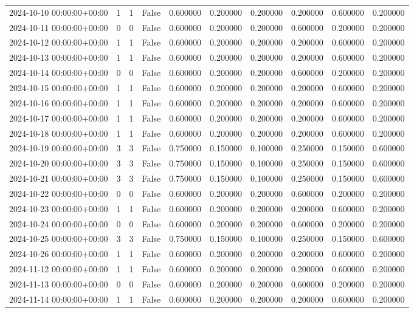 \begin{tabular}{lrrrrrrrrr}
2024-10-10 00:00:00+00:00 & 1 & 1 & False & 0.600000 & 0.200000 & 0.200000 & 0.200000 & 0.600000 & 0.200000 \\
2024-10-11 00:00:00+00:00 & 0 & 0 & False & 0.600000 & 0.200000 & 0.200000 & 0.600000 & 0.200000 & 0.200000 \\
2024-10-12 00:00:00+00:00 & 1 & 1 & False & 0.600000 & 0.200000 & 0.200000 & 0.200000 & 0.600000 & 0.200000 \\
2024-10-13 00:00:00+00:00 & 1 & 1 & False & 0.600000 & 0.200000 & 0.200000 & 0.200000 & 0.600000 & 0.200000 \\
2024-10-14 00:00:00+00:00 & 0 & 0 & False & 0.600000 & 0.200000 & 0.200000 & 0.600000 & 0.200000 & 0.200000 \\
2024-10-15 00:00:00+00:00 & 1 & 1 & False & 0.600000 & 0.200000 & 0.200000 & 0.200000 & 0.600000 & 0.200000 \\
2024-10-16 00:00:00+00:00 & 1 & 1 & False & 0.600000 & 0.200000 & 0.200000 & 0.200000 & 0.600000 & 0.200000 \\
2024-10-17 00:00:00+00:00 & 1 & 1 & False & 0.600000 & 0.200000 & 0.200000 & 0.200000 & 0.600000 & 0.200000 \\
2024-10-18 00:00:00+00:00 & 1 & 1 & False & 0.600000 & 0.200000 & 0.200000 & 0.200000 & 0.600000 & 0.200000 \\
2024-10-19 00:00:00+00:00 & 3 & 3 & False & 0.750000 & 0.150000 & 0.100000 & 0.250000 & 0.150000 & 0.600000 \\
2024-10-20 00:00:00+00:00 & 3 & 3 & False & 0.750000 & 0.150000 & 0.100000 & 0.250000 & 0.150000 & 0.600000 \\
2024-10-21 00:00:00+00:00 & 3 & 3 & False & 0.750000 & 0.150000 & 0.100000 & 0.250000 & 0.150000 & 0.600000 \\
2024-10-22 00:00:00+00:00 & 0 & 0 & False & 0.600000 & 0.200000 & 0.200000 & 0.600000 & 0.200000 & 0.200000 \\
2024-10-23 00:00:00+00:00 & 1 & 1 & False & 0.600000 & 0.200000 & 0.200000 & 0.200000 & 0.600000 & 0.200000 \\
2024-10-24 00:00:00+00:00 & 0 & 0 & False & 0.600000 & 0.200000 & 0.200000 & 0.600000 & 0.200000 & 0.200000 \\
2024-10-25 00:00:00+00:00 & 3 & 3 & False & 0.750000 & 0.150000 & 0.100000 & 0.250000 & 0.150000 & 0.600000 \\
2024-10-26 00:00:00+00:00 & 1 & 1 & False & 0.600000 & 0.200000 & 0.200000 & 0.200000 & 0.600000 & 0.200000 \\
2024-11-12 00:00:00+00:00 & 1 & 1 & False & 0.600000 & 0.200000 & 0.200000 & 0.200000 & 0.600000 & 0.200000 \\
2024-11-13 00:00:00+00:00 & 0 & 0 & False & 0.600000 & 0.200000 & 0.200000 & 0.600000 & 0.200000 & 0.200000 \\
2024-11-14 00:00:00+00:00 & 1 & 1 & False & 0.600000 & 0.200000 & 0.200000 & 0.200000 & 0.600000 & 0.200000 \\
\bottomrule
\end{tabular}
